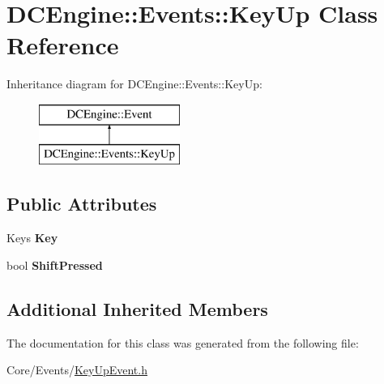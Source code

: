 \hypertarget{classDCEngine_1_1Events_1_1KeyUp}{\section{D\-C\-Engine\-:\-:Events\-:\-:Key\-Up Class Reference}
\label{classDCEngine_1_1Events_1_1KeyUp}
}
Inheritance diagram for D\-C\-Engine\-:\-:Events\-:\-:Key\-Up\-:\begin{figure}[H]
\begin{center}
\leavevmode
\includegraphics[height=2.000000cm]{classDCEngine_1_1Events_1_1KeyUp}
\end{center}
\end{figure}
\subsection*{Public Attributes}
\begin{DoxyCompactItemize}
\item 
\hypertarget{classDCEngine_1_1Events_1_1KeyUp_a19103bb6f6423bbed97c61b4da6ddf3c}{Keys {\bfseries Key}}\label{classDCEngine_1_1Events_1_1KeyUp_a19103bb6f6423bbed97c61b4da6ddf3c}

\item 
\hypertarget{classDCEngine_1_1Events_1_1KeyUp_ab059a066152908d3198d349feb89adbd}{bool {\bfseries Shift\-Pressed}}\label{classDCEngine_1_1Events_1_1KeyUp_ab059a066152908d3198d349feb89adbd}

\end{DoxyCompactItemize}
\subsection*{Additional Inherited Members}


The documentation for this class was generated from the following file\-:\begin{DoxyCompactItemize}
\item 
Core/\-Events/\hyperlink{KeyUpEvent_8h}{Key\-Up\-Event.\-h}\end{DoxyCompactItemize}
